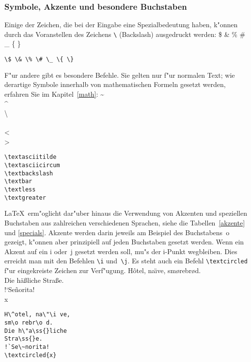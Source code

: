 \subsubsection{Symbole, Akzente und besondere Buchstaben}\label{symbole}

Einige der Zeichen, die bei der Eingabe eine Spezialbedeutung haben,
k"onnen durch das Voranstellen des
Zeichens \verb|\| (Back\-slash) ausgedruckt werden:
\exa
\$ \& \% \# \_ \{ \}
\exb
\begin{verbatim}
\$ \& \% \# \_ \{ \}
\end{verbatim}
\exc
F"ur andere gibt es besondere Befehle.  Sie gelten nur f"ur normalen
Text; wie derartige Symbole innerhalb von mathematischen
Formeln gesetzt werden, erfahren Sie im Kapitel~\ref{math}:
\exa
\textasciitilde \\
\textasciicircum \\
\textbackslash \\
\textbar \\ 
\textless\\
\textgreater
\exb
\begin{verbatim}
\textasciitilde
\textasciicircum
\textbackslash 
\textbar  
\textless  
\textgreater
\end{verbatim}
\exc

\LaTeX\ erm"oglicht dar"uber hinaus die Verwendung von Akzenten 
und speziellen Buchstaben aus zahlreichen verschiedenen Sprachen, 
siehe die Tabellen~\ref{akzente}  und \ref{specials}.
Akzente werden darin jeweils am Beispiel
des Buchstabens~o gezeigt, k"onnen aber prinzipiell auf jeden
Buchstaben gesetzt werden.
Wenn ein Akzent auf ein i oder~j gesetzt werden soll, mu"s der
\mbox{i-Punkt} wegbleiben. Dies erreicht man mit den Befehlen
\verb|\i| und~\verb|\j|.
Es steht auch ein Befehl \verb|\textcircled| f"ur 
eingekreiste Zeichen zur Verf"ugung.
\exa
\umlauthigh %
H\^otel, na\"\i ve, sm\o rebr\o d.\\[1\baselineskip]
\umlautlow
Die h\"a\ss{}liche Stra\ss{}e.\\[1\baselineskip]
!`Se\~norita!\\
\textcircled{x}
\exb
\begin{verbatim}
H\^otel, na\"\i ve,
sm\o rebr\o d.
Die h\"a\ss{}liche
Stra\ss{}e.
!`Se\~norita!
\textcircled{x}
\end{verbatim}
\exc

